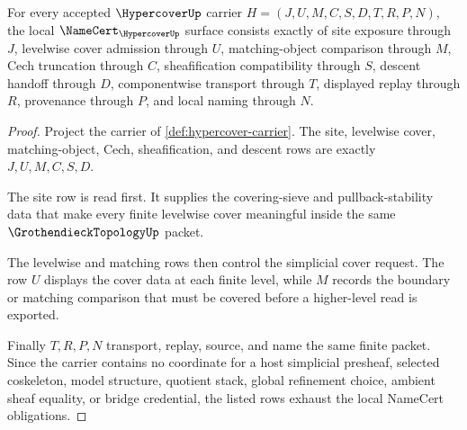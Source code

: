 \begin{theorem}
\label{thm:hypercover-namecert-obligations}
For every accepted $\HypercoverUp$ carrier $H=(J,U,M,C,S,D,T,R,P,N)$, the local $\NameCert_{\HypercoverUp}$ surface consists exactly of site exposure through $J$, levelwise cover admission through $U$, matching-object comparison through $M$, Cech truncation through $C$, sheafification compatibility through $S$, descent handoff through $D$, componentwise transport through $T$, displayed replay through $R$, provenance through $P$, and local naming through $N$.
\end{theorem}
\begin{proof}
Project the carrier of \autoref{def:hypercover-carrier}. The site, levelwise cover, matching-object, Cech, sheafification, and descent rows are exactly $J,U,M,C,S,D$.

The site row is read first. It supplies the covering-sieve and pullback-stability data that make every finite levelwise cover meaningful inside the same $\GrothendieckTopologyUp$ packet.

The levelwise and matching rows then control the simplicial cover request. The row $U$ displays the cover data at each finite level, while $M$ records the boundary or matching comparison that must be covered before a higher-level read is exported.

Finally $T,R,P,N$ transport, replay, source, and name the same finite packet. Since the carrier contains no coordinate for a host simplicial presheaf, selected coskeleton, model structure, quotient stack, global refinement choice, ambient sheaf equality, or bridge credential, the listed rows exhaust the local NameCert obligations.
\end{proof}

